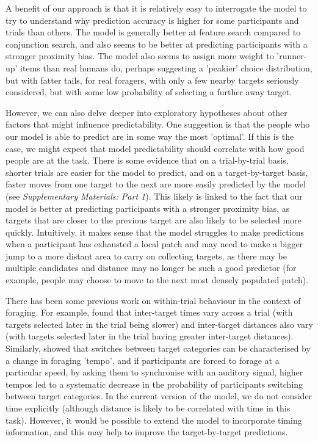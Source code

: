 \documentclass[preprints, article,submit,pdftex,moreauthors]{Definitions/mdpi}
\begin{document}
A benefit of our approach is that it is relatively easy to interrogate the model to try to understand why prediction accuracy is higher for some participants and trials than others. The model is generally better at feature search compared to conjunction search, and also seems to be better at predicting participants with a stronger proximity bias. The model also seems to assign more weight to 'runner-up' items than real humans do, perhaps suggesting a 'peakier' choice distribution, but with fatter tails, for real foragers, with only a few nearby targets seriously considered, but with some low probability of selecting a further away target. 
 
However, we can also delve deeper into exploratory hypotheses about other factors that might influence predictability. One suggestion is that the people who our model is able to predict are in some way the most 'optimal'. If this is the case, we might expect that model predictability should correlate with how good people are at the task. There is some evidence that on a trial-by-trial basis, shorter trials are easier for the model to predict, and on a target-by-target basis, faster moves from one target to the next are more easily predicted by the model (see \textit{Supplementary Materials: Part 1}). This likely is linked to the fact that our model is better at predicting participants with a stronger proximity bias, as targets that are closer to the previous target are also likely to be selected more quickly. Intuitively, it makes sense that the model struggles to make predictions when a participant has exhausted a local patch and may need to make a bigger jump to a more distant area to carry on collecting targets, as there may be multiple candidates and distance may no longer be such a good predictor (for example, people may choose to move to the next most densely populated patch). 
 
There has been some previous work on within-trial behaviour in the context of foraging. For example, \citep{tagu2020} found that inter-target times vary across a trial (with targets selected later in the trial being slower) and inter-target distances also vary (with targets selected later in the trial having greater inter-target distances). Similarly, \citep{thornton2022foraging} showed that switches between target categories can be characterised by a change in foraging 'tempo', and if participants are forced to forage at a particular speed, by asking them to synchronise with an auditory signal, higher tempos led to a systematic decrease in the probability of participants switching between target categories. In the current version of the model, we do not consider time explicitly (although distance is likely to be correlated with time in this task). However, it would be possible to extend the model to incorporate timing information, and this may help to improve the target-by-target predictions.
 
\end{document}
